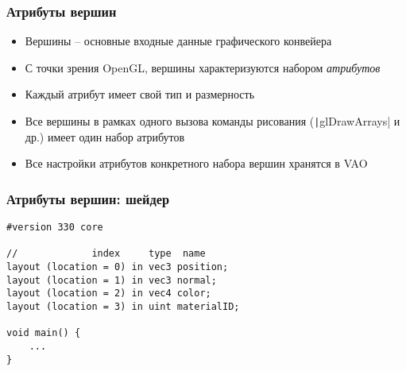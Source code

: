 \documentclass[10pt]{beamer}
\begin{document}
\begin{frame}[fragile]
\frametitle{Атрибуты вершин}
\begin{itemize}
\item Вершины -- основные входные данные графического конвейера
\pause
\item С точки зрения OpenGL, вершины характеризуются набором \textit{атрибутов}
\pause
\item Каждый атрибут имеет свой тип и размерность
\pause
\item Все вершины в рамках одного вызова команды рисования (\texttt|glDrawArrays| и др.) имеет один набор атрибутов
\pause
\item Все настройки атрибутов конкретного набора вершин хранятся в VAO
\end{itemize}
\end{frame}

\begin{frame}[fragile]
\frametitle{Атрибуты вершин: шейдер}
\begin{verbatim}
#version 330 core

//             index     type  name
layout (location = 0) in vec3 position;
layout (location = 1) in vec3 normal;
layout (location = 2) in vec4 color;
layout (location = 3) in uint materialID;

void main() {
    ...
}
\end{verbatim}
\end{frame}
\end{document}
